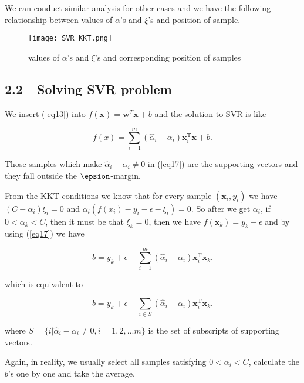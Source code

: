 \documentclass{article}
\begin{document}
We can conduct similar analysis for other cases and we have the following relationship between values of $\alpha$'s and $\xi$'s and position of sample.

\begin{figure}[H]
\centering
\texttt{[image: SVR KKT.png]}
\caption{values of $\alpha$'s and $\xi$'s and corresponding position of samples}
\label{fig7}
\end{figure}

\subsection*{2.2 $    $ $  $ Solving SVR problem}

We insert (\ref{eq13}) into $f(\boldsymbol{x}) = \boldsymbol{w}^T\boldsymbol{x}+b$ and the solution to SVR is like

\begin{equation} \label{eq17}
f(x)=\sum_{i=1}^m\left(\hat{\alpha}_i-\alpha_i\right) \boldsymbol{x}_i^{\mathrm{T}} \boldsymbol{x}+b .
\end{equation}

Those samples which make $\hat{\alpha}_i-\alpha_i \neq 0$ in (\ref{eq17}) are the supporting vectors and they fall outside the $\epsion$-margin.

From the KKT conditions we know that for every sample $(\boldsymbol{x}_i,y_i)$ we have $(C-\alpha_i)\xi_i = 0$ and $\alpha_i\left(f\left(x_i\right)-y_i-\epsilon-\xi_i\right)=0$. So after we get $\alpha_i$, if $0 < \alpha_k < C$, then it must be that $\xi_k = 0$, then we have $f(\boldsymbol{x}_k) = y_k + \epsilon$ and by using (\ref{eq17}) we have

$$
b=y_k+\epsilon-\sum_{i=1}^m\left(\hat{\alpha}_i-\alpha_i\right) \boldsymbol{x}_i^{\mathrm{T}} \boldsymbol{x}_k .
$$

which is equivalent to

$$
b=y_k+\epsilon-\sum_{i \in S}\left(\hat{\alpha}_i-\alpha_i\right) \boldsymbol{x}_i^{\mathrm{T}} \boldsymbol{x}_k .
$$

where $S = \{ i| \hat{\alpha}_i-\alpha_i \neq 0, i=1,2,...m\}$ is the set of subscripts of supporting vectors.

Again, in reality, we usually select all samples satisfying $0 < \alpha_i < C$, calculate the $b$'s one by one and take the average.

\end{document}
